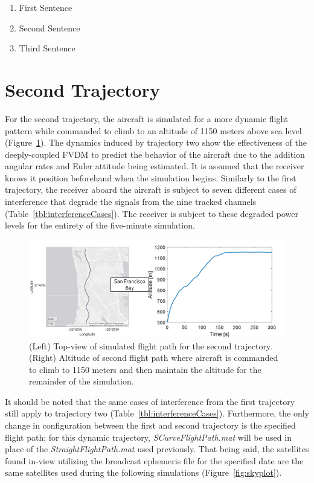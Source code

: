 \begin{enumerate}
    \item First Sentence
    \item Second Sentence
    \item Third Sentence
\end{enumerate}
\clearpage

\section{\textbf{Second Trajectory}}
For the second trajectory, the aircraft is simulated for a more dynamic flight pattern while commanded to climb to an altitude of 1150 meters above sea level (Figure~\ref{fig:trajectory2}). The dynamics induced by trajectory two show the effectiveness of the deeply-coupled FVDM to predict the behavior of the aircraft due to the addition angular rates and Euler attitude being estimated. It is assumed that the receiver knows it position beforehand when the simulation begins. Similarly to the first trajectory, the receiver aboard the aircraft is subject to seven different cases of interference that degrade the signals from the nine tracked channels (Table~\ref{tbl:interferenceCases}). The receiver is subject to these degraded power levels for the entirety of the five-minute simulation.

\begin{figure}[!ht]
    \centering
    \includegraphics[width=\linewidth]{Figures/Results/trajectory2.png}
    \caption{(Left) Top-view of simulated flight path for the second trajectory. (Right) Altitude of second flight path where aircraft is commanded to climb to 1150 meters and then maintain the altitude for the remainder of the simulation.}\label{fig:trajectory2}
\end{figure}

It should be noted that the same cases of interference from the first trajectory still apply to trajectory two (Table~\ref{tbl:interferenceCases}). Furthermore, the only change in configuration between the first and second trajectory is the specified flight path; for this dynamic trajectory, \textit{SCurveFlightPath.mat} will be used in place of the \textit{StraightFlightPath.mat} used previously. That being said, the satellites found in-view utilizing the broadcast ephemeris file for the specified date are the same satellites used during the following simulations (Figure~\ref{fig:skyplot}).


